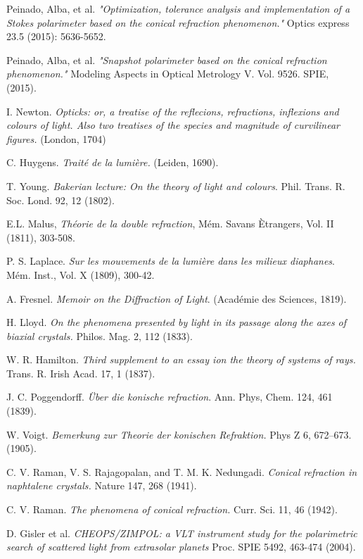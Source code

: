 \documentclass[11pt, a4paper, twoside]{article} %
\begin{document}
\begin{thebibliography}{1}
Peinado, Alba, et al. {\em "Optimization, tolerance analysis and implementation of a Stokes polarimeter based on the conical refraction phenomenon."} Optics express 23.5 (2015): 5636-5652.

Peinado, Alba, et al. {\em "Snapshot polarimeter based on the conical refraction phenomenon."} Modeling Aspects in Optical Metrology V. Vol. 9526. SPIE, (2015).

I. Newton. {\em Opticks: or, a treatise of the reflecions, refractions, inflexions and colours of light. Also two treatises of the species and magnitude of curvilinear figures.} (London, 1704)

C. Huygens. {\em Traité de la lumière.} (Leiden, 1690).

T. Young. {\em Bakerian lecture: On the theory of light and colours}. Phil. Trans. R. Soc. Lond. 92, 12 (1802).

E.L. Malus, {\em Théorie de la double refraction}, Mém. Savans Ètrangers, Vol. II (1811), 303-508.
 
P. S. Laplace. {\em Sur les mouvements de la lumière dans les milieux diaphanes}. Mém. Inst., Vol. X (1809), 300-42.

A. Fresnel. {\em Memoir on the Diffraction of Light}. (Académie des Sciences, 1819).


H. Lloyd. {\em  On the phenomena presented by light in its passage along the axes of biaxial crystals.} Philos. Mag. 2, 112 (1833).

W. R. Hamilton. {\em Third supplement to an essay ion the theory of systems of rays.} Trans. R. Irish Acad. 17, 1 (1837).

J. C. Poggendorff. {\em Über die konische refraction}. Ann. Phys, Chem. 124, 461 (1839).

W. Voigt. {\em Bemerkung zur Theorie der konischen Refraktion.} Phys Z 6, 672–673. (1905).

C. V. Raman, V. S. Rajagopalan, and T. M. K. Nedungadi. {\em Conical refraction in naphtalene crystals.} Nature 147, 268 (1941).

C. V. Raman. {\em The phenomena of conical refraction.} Curr. Sci. 11, 46 (1942).

D. Gisler et al. {\em CHEOPS/ZIMPOL: a VLT instrument study for the polarimetric search of scattered light from extrasolar planets} Proc. SPIE 5492, 463-474 (2004).


\end{thebibliography}
\end{document}
